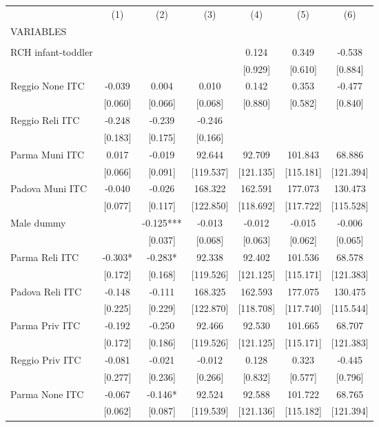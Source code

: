 \begin{tabular}{lcccccc} \hline
 & (1) & (2) & (3) & (4) & (5) & (6) \\
VARIABLES &  &  &  &  &  &  \\ \hline
 &  &  &  &  &  &  \\
RCH infant-toddler &  &  &  & 0.124 & 0.349 & -0.538 \\
 &  &  &  & [0.929] & [0.610] & [0.884] \\
Reggio None ITC & -0.039 & 0.004 & 0.010 & 0.142 & 0.353 & -0.477 \\
 & [0.060] & [0.066] & [0.068] & [0.880] & [0.582] & [0.840] \\
Reggio Reli ITC & -0.248 & -0.239 & -0.246 &  &  &  \\
 & [0.183] & [0.175] & [0.166] &  &  &  \\
Parma Muni ITC & 0.017 & -0.019 & 92.644 & 92.709 & 101.843 & 68.886 \\
 & [0.066] & [0.091] & [119.537] & [121.135] & [115.181] & [121.394] \\
Padova Muni ITC & -0.040 & -0.026 & 168.322 & 162.591 & 177.073 & 130.473 \\
 & [0.077] & [0.117] & [122.850] & [118.692] & [117.722] & [115.528] \\
Male dummy &  & -0.125*** & -0.013 & -0.012 & -0.015 & -0.006 \\
 &  & [0.037] & [0.068] & [0.063] & [0.062] & [0.065] \\
Parma Reli ITC & -0.303* & -0.283* & 92.338 & 92.402 & 101.536 & 68.578 \\
 & [0.172] & [0.168] & [119.526] & [121.125] & [115.171] & [121.383] \\
Padova Reli ITC & -0.148 & -0.111 & 168.325 & 162.593 & 177.075 & 130.475 \\
 & [0.225] & [0.229] & [122.870] & [118.708] & [117.740] & [115.544] \\
Parma Priv ITC & -0.192 & -0.250 & 92.466 & 92.530 & 101.665 & 68.707 \\
 & [0.172] & [0.186] & [119.526] & [121.125] & [115.171] & [121.383] \\
Reggio Priv ITC & -0.081 & -0.021 & -0.012 & 0.128 & 0.323 & -0.445 \\
 & [0.277] & [0.236] & [0.266] & [0.832] & [0.577] & [0.796] \\
Parma None ITC & -0.067 & -0.146* & 92.524 & 92.588 & 101.722 & 68.765 \\
 & [0.062] & [0.087] & [119.539] & [121.136] & [115.182] & [121.394] \\

\end{tabular}

